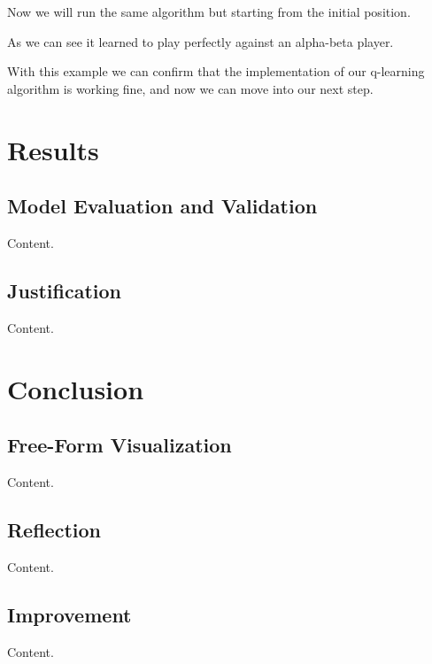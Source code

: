 \documentclass{article}
\begin{document}
Now we will run the same algorithm but starting from the initial position. 


As we can see it learned to play perfectly against an alpha-beta player.

With this example we can confirm that the implementation of our q-learning algorithm
is working fine, and now we can move into our next step.

\section{Results}

\subsection{Model Evaluation and Validation}

Content.

\subsection{Justification}

Content.

\section{Conclusion}

\subsection{Free-Form Visualization}

Content.

\subsection{Reflection}

Content.

\subsection{Improvement}

Content.




\end{document}
